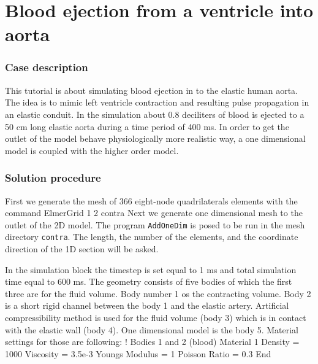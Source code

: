 \chapter{Blood ejection from a ventricle into aorta}


\subsection*{Case description}

This tutorial is about simulating blood ejection in to the elastic human aorta.
The idea is to mimic left ventricle contraction and resulting pulse propagation 
in an elastic conduit. In the simulation about 0.8 
deciliters of blood is ejected to a 50 cm long elastic aorta during a time 
period of 400 ms.  In order to get the outlet of the model behave 
physiologically more realistic way, a one dimensional model is coupled
with the higher order model.
 
\subsection*{Solution procedure}

First we generate the mesh of 366 eight-node quadrilaterals elements with 
the command
\ttbegin
ElmerGrid 1 2 contra
\ttend
Next we generate one dimensional mesh to the outlet of the 2D model.
The program {\tt AddOneDim} is posed to be run in the mesh directory
{\tt contra}.  The length, the number of the elements, 
and the coordinate direction of the 1D section will be asked.

In the simulation block the timestep is set equal to 1 ms and 
total simulation time equal to 600 ms.  The geometry consists of five bodies
of which the first three are for the fluid volume.  Body number 1 os the 
contracting volume.  Body 2 is a short rigid channel between the body 1 and 
the elastic artery. Artificial compressibility
method is used for the fluid volume (body 3) which is in contact with the 
elastic wall (body 4).  One dimensional model is the body 5. 
Material settings for those are 
following:
\ttbegin
! Bodies 1 and 2 (blood)
Material 1
  Density = 1000
  Viscosity = 3.5e-3
  Youngs Modulus = 1
  Poisson Ratio = 0.3
End

